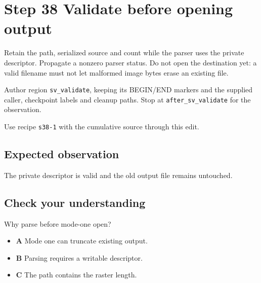 \section{Step 38 Validate before opening output}\label{ppm-s38}

Retain the path, serialized source and count while the parser uses the private descriptor. Propagate a nonzero parser status. Do not open the destination yet: a valid filename must not let malformed image bytes erase an existing file.

Author region \texttt{sv\_validate}, keeping its BEGIN/END markers and the supplied caller, checkpoint labels and cleanup paths. Stop at \texttt{after\_sv\_validate} for the observation.

Use recipe \texttt{s38-1} with the cumulative source through this edit.

\subsection{Expected observation}
The private descriptor is valid and the old output file remains untouched.

\subsection{Check your understanding}
Why parse before mode-one open?

\begin{itemize}
  \item \textbf{A} Mode one can truncate existing output.
  \item \textbf{B} Parsing requires a writable descriptor.
  \item \textbf{C} The path contains the raster length.
\end{itemize}
